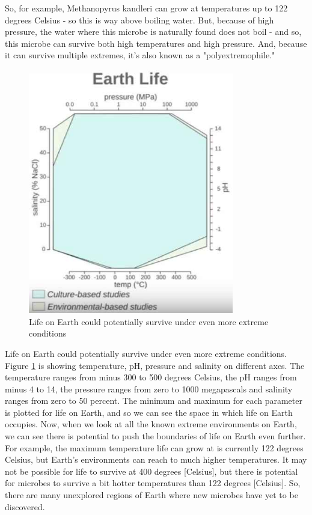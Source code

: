\documentclass[]{article}
\begin{document}
So, for example,
Methanopyrus kandleri can grow
at temperatures
up to 122 degrees Celsius -
so this is way above boiling water.
But, because of high pressure,
the water where this microbe
is naturally found does not boil -
and so, this microbe can survive
both high temperatures and high pressure.
And, because it can survive
multiple extremes,
it's also known as
a "polyextremophile."

\begin{figure}[H]
	\begin{center}
		\caption{Life on Earth could potentially survive
		under even more extreme conditions}\label{fig:EarthLifeExtremes}
		\includegraphics[width=0.8\textwidth]{EarthLifeExtremes}
	\end{center}
\end{figure}
Life on Earth could potentially survive
under even more extreme conditions.
Figure \ref{fig:EarthLifeExtremes} is showing
temperature, pH,
pressure and salinity on different axes.
The temperature ranges from minus 300
to 500 degrees Celsius,
the pH ranges from minus 4 to 14,
the pressure ranges from zero
to 1000 megapascals
and salinity ranges from zero
to 50 percent.
The minimum and maximum
for each parameter
is plotted for life on Earth,
and so we can see the space
in which life on Earth occupies.
Now, when we look at all the known
extreme environments on Earth,
we can see there is potential
to push the boundaries of life
on Earth even further.
For example, the maximum temperature
life can grow at
is currently 122 degrees Celsius,
but Earth's environments can reach
to much higher temperatures.
It may not be possible for life to survive
at 400 degrees [Celsius],
but there is potential for microbes
to survive a bit hotter temperatures
than 122 degrees [Celsius].
So, there are many unexplored
regions of Earth
where new microbes
have yet to be discovered.
\end{document}
